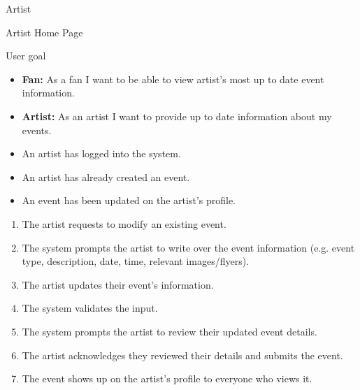 \documentclass[11pt]{report}
\begin{document}
\begin{description}[leftmargin=2.2cm, style=nextline]
  \item[Primary Actor] Artist
  \item[Scope] Artist Home Page
  \item[Level] User goal
  \item[Stakeholders \& Interests]
    \begin{itemize}
      \item \textbf{Fan:} As a fan I want to be able to view artist's most up to date event information.
      \item \textbf{Artist:} As an artist I want to provide up to date information about my events.
    \end{itemize}
  \item[Preconditions]
    \begin{itemize}
      \item An artist has logged into the system.
      \item An artist has already created an event.

    \end{itemize}
  \item[Postconditions (Success Guarantee)]
    \begin{itemize}
      \item An event has been updated on the artist's profile.
    \end{itemize}
  \item[Main Success Scenario]
    \begin{enumerate}
      \item The artist requests to modify an existing event.
      \item The system prompts the artist to write over the event information (e.g. event type, description, date, time, relevant images/flyers).
      \item The artist updates their event's information.
      \item The system validates the input.
      \item The system prompts the artist to review their updated event details.
      \item The artist acknowledges they reviewed their details and submits the event.
      \item The event shows up on the artist's profile to everyone who views it.


\end{enumerate}
\end{description}
\end{document}
